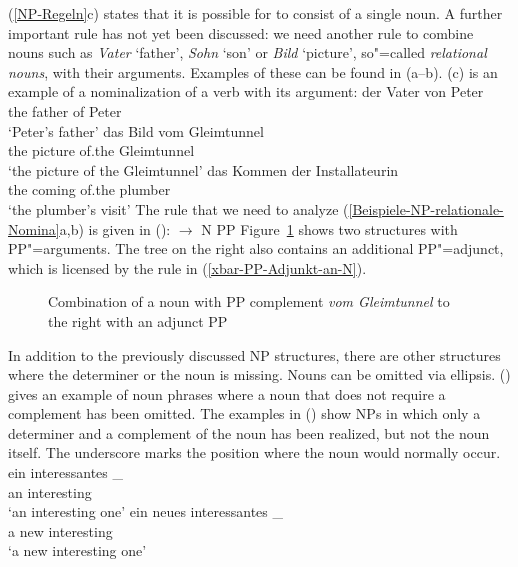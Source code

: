 (\ref{NP-Regeln}c) states that it is possible for \nbar to consist of a single noun. A further important rule has not yet been
discussed: we need another rule to combine nouns such as \emph{Vater} `father', \emph{Sohn} `son' or \emph{Bild} `picture', 
so"=called \emph{relational nouns}, with their arguments. Examples of these can be found in (a--b).
(c) is an example of a nominalization of a verb with its argument:
\eal
\label{Beispiele-NP-relationale-Nomina}
\ex 
\gll der Vater von Peter\\
	 the father of Peter\\
\glt `Peter's father'
\ex 
\gll das Bild vom Gleimtunnel\\
	 the picture of.the Gleimtunnel\\
\glt `the picture of the Gleimtunnel'
\ex 
\gll das Kommen der Installateurin\\
	 the coming of.the plumber\\
\glt `the plumber's visit'
\zl
\noindent
The rule that we need to analyze (\ref{Beispiele-NP-relationale-Nomina}a,b) is given in
():
\ea
\nbar $\to$ N PP
\z
%
Figure~\ref{Abbildung-NP-mit-PP-Argument} shows two structures with PP"=arguments. The tree on the right also contains an additional PP"=adjunct, which is licensed
by the rule in (\ref{xbar-PP-Adjunkt-an-N}).
\begin{figure}
\caption{\label{Abbildung-NP-mit-PP-Argument}Combination of a noun with PP complement
  \emph{vom Gleimtunnel} to the right with an adjunct PP}
\end{figure}%


In addition to the previously discussed NP structures, there are other structures where the
determiner or the noun is missing.
Nouns can be omitted via ellipsis. () gives an example of noun phrases where a noun that does not require a complement
has been omitted. The examples in () show NPs in which only a determiner and a complement of the noun has been realized,
but not the noun itself. The underscore marks the position where the noun would normally occur. 
\eal
\label{ex-nounless-np}
\ex 
\gll ein interessantes \_\\
     an  interesting\\
\glt `an interesting one'
\ex 
\gll ein neues interessantes \_\\
     a   new   interesting\\
\glt `a new interesting one'

